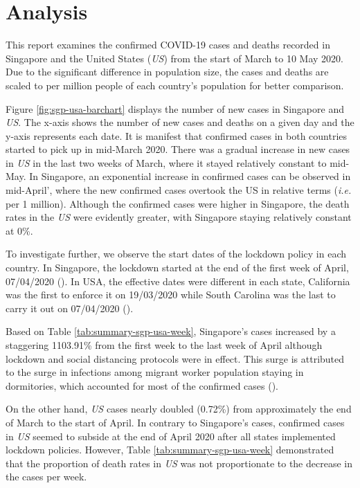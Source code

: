 \documentclass[11pt,a4paper,]{article}
\begin{document}
\hypertarget{analysis}{%
\section{Analysis}\label{analysis}}

This report examines the confirmed COVID-19 cases and deaths recorded in Singapore and the United States (\emph{US}) from the start of March to 10 May 2020. Due to the significant difference in population size, the cases and deaths are scaled to per million people of each country's population for better comparison.

Figure \ref{fig:sgp-usa-barchart} displays the number of new cases in Singapore and \emph{US}. The x-axis shows the number of new cases and deaths on a given day and the y-axis represents each date. It is manifest that confirmed cases in both countries started to pick up in mid-March 2020. There was a gradual increase in new cases in \emph{US} in the last two weeks of March, where it stayed relatively constant to mid-May. In Singapore, an exponential increase in confirmed cases can be observed in mid-April', where the new confirmed cases overtook the US in relative terms (\emph{i.e.} per 1 million). Although the confirmed cases were higher in Singapore, the death rates in the \emph{US} were evidently greater, with Singapore staying relatively constant at 0\%.

To investigate further, we observe the start dates of the lockdown policy in each country. In Singapore, the lockdown started at the end of the first week of April, 07/04/2020 (\textcite{sgcb}). In USA, the effective dates were different in each state, California was the first to enforce it on 19/03/2020 while South Carolina was the last to carry it out on 07/04/2020 (\textcite{fowler2020effect}).

Based on Table \ref{tab:summary-sgp-usa-week}, Singapore's cases increased by a staggering 1103.91\% from the first week to the last week of April although lockdown and social distancing protocols were in effect. This surge is attributed to the surge in infections among migrant worker population staying in dormitories, which accounted for most of the confirmed cases (\textcite{sgcb2}).

On the other hand, \emph{US} cases nearly doubled (0.72\%) from approximately the end of March to the start of April. In contrary to Singapore's cases, confirmed cases in \emph{US} seemed to subside at the end of April 2020 after all states implemented lockdown policies. However, Table \ref{tab:summary-sgp-usa-week} demonstrated that the proportion of death rates in \emph{US} was not proportionate to the decrease in the cases per week.
\end{document}
